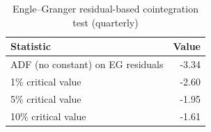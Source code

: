 \begin{table}

\caption{\label{tab:engle-granger}Engle--Granger residual-based cointegration test (quarterly)}
\centering
\begin{tabular}[t]{lr}
\toprule
Statistic & Value\\
\midrule
ADF (no constant) on EG residuals & -3.34\\
1\% critical value & -2.60\\
5\% critical value & -1.95\\
10\% critical value & -1.61\\
\bottomrule
\end{tabular}
\end{table}
